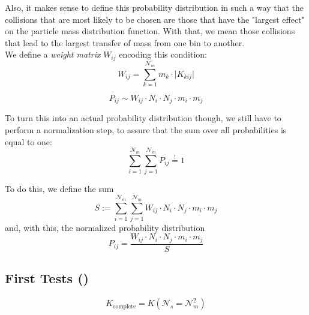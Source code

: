     Also, it makes sense to define this probability distribution in such a way that the collisions 
    that are most likely to be chosen are those that have the "largest effect" on the particle mass 
    distribution function. With that, we mean those collisions that lead to the largest transfer of 
    mass from one bin to another. \\
    
    We define a \textit{weight matrix} $W_{ij}$ encoding this condition:
    \begin{equation} 
        W_{ij}
            = \sum_{k=1}^{\mathcal N_m} m_k \cdot \big|K_{kij}\big|
    \end{equation}

    \begin{equation}
        P_{ij}
            \sim W_{ij}\cdot N_i\cdot N_j\cdot m_i\cdot m_j
    \end{equation}

    To turn this into an actual probability distribution though, we still have to perform a 
    normalization step, to assure that the sum over all probabilities is equal to one:
    \begin{equation}
        \sum_{i=1}^{\mathcal N_m}\sum_{j=1}^{\mathcal N_m}P_{ij}
            \overset{!}{=}1
    \end{equation}

    To do this, we define the sum
    \begin{equation}
        S
            := \sum_{i=1}^{\mathcal N_m} \sum_{j=1}^{\mathcal N_m}
               W_{ij} \cdot N_i \cdot N_j \cdot m_i \cdot m_j
    \end{equation}
    and, with this, the normalized probability distribution
    \begin{equation}
        P_{ij}
            = \frac{W_{ij} \cdot N_i \cdot N_j \cdot m_i \cdot m_j}{S}
    \end{equation}

    \subsection{First Tests ()}

    $$K_\text{complete}=K(\mathcal{N}_s=\mathcal{N}_m^2)$$

